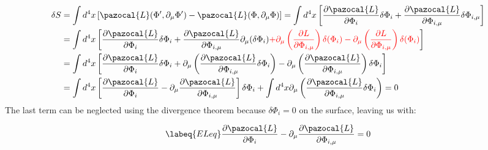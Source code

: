 \documentclass[../main.tex]{subfiles}
\begin{document}
\begin{align*}
\delta S&=\int d^4x\left[\pazocal{L}(\Phi',\partial_{\mu}\Phi')-\pazocal{L}(\Phi,\partial_{\mu}\Phi)\right]=\int d^4x\left[\frac{\partial\pazocal{L}}{\partial\Phi_i}\delta\Phi_i+\frac{\partial\pazocal{L}}{\partial\Phi_{i,\mu}}\delta\Phi_{i,\mu}\right]\\
&=\int d^4x\left[\frac{\partial\pazocal{L}}{\partial\Phi_i}\delta\Phi_i+\frac{\partial\pazocal{L}}{\partial\Phi_{i,\mu}}\partial_\mu(\delta\Phi_i){\color{red}+\partial_\mu\left(\frac{\partial L}{\partial\Phi_{i,\mu}}\right)\delta(\Phi_i)-\partial_\mu\left(\frac{\partial L}{\partial\Phi_{i,\mu}}\right)\delta(\Phi_i)}\right]\\
&=\int d^4x\left[\frac{\partial\pazocal{L}}{\partial\Phi_i}\delta\Phi_i+\partial_{\mu}\left(\frac{\partial\pazocal{L}}{\partial\Phi_{i,\mu}}\delta\Phi_i\right)-\partial_{\mu}\left(\frac{\partial\pazocal{L}}{\partial\Phi_{i,\mu}}\right)\delta\Phi_i\right]\\
&=\int d^4x\left[\frac{\partial\pazocal{L}}{\partial\Phi_i}-\partial_{\mu}\frac{\partial\pazocal{L}}{\partial\Phi_{i,\mu}}\right]\delta\Phi_i+\int d^4x\partial_{\mu}\left(\frac{\partial\pazocal{L}}{\partial\Phi_{i,\mu}}\delta\Phi_i\right)=0
\end{align*}
The last term can be neglected using the divergence theorem because $\delta\Phi_i=0$ on the surface, leaving us with:
\begin{kaobox}[frametitle=Euler-Lagrange equation]
\begin{equation}
\labeq{ELeq}
\frac{\partial\pazocal{L}}{\partial\Phi_i}-\partial_{\mu}\frac{\partial\pazocal{L}}{\partial\Phi_{i,\mu}}=0
\end{equation}
\end{kaobox}
\end{document}
